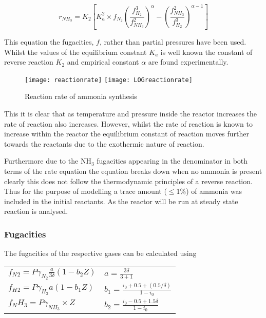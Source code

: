 {\begin{equation} r_{NH_3} = K_2 \left [ K_a^2 \times f_{N_2}
\left ( \frac{f_{H_2}^3}{f_{NH_3}^2} \right ) ^\alpha - \left ( \frac{f_{NH_3}^2}{f_{H_2}^3} \right ) ^{\alpha - 1}
\right ]
\end{equation}

This equation the fugacities, $f$, rather than partial pressures have been used. Whilst the values of the equilibrium constant $K_a$ is well known the constant of reverse reaction $K_2$ and empirical constant $\alpha$ are found experimentally.

{\begin{figure}[h]
		\centering
		\caption{Reaction rate of ammonia synthesis}
		{\centering
			
			\texttt{[image: reactionrate]}
			\texttt{[image: LOGreactionrate]}	
		}

\end{figure}}


This it is clear that as temperature and pressure inside the reactor increases the rate of reaction also increases. However, whilst the rate of reaction is known to increase within the reactor the equilibrium constant of reaction moves further towards the reactants due to the exothermic nature of reaction. 

Furthermore due to the NH$_3$ fugacities appearing in the denominator in both terms of the rate equation the equation breaks down when no ammonia is present clearly this does not follow the thermodynamic principles of a reverse reaction. Thus for the purpose of modelling a trace amount ($\leq$1\%) of ammonia was included in the initial reactants. As the reactor will be run at steady state reaction is analysed. 

\subsubsection{Fugacities}
The fugacities of the respective gases can be calculated using


\begin{table} [!htbp]
	\begin{center}
\begin{tabular}{ p{5cm}p{3cm} }
$f_N{_2}= P\gamma_{N_2}\frac{a}{3\delta}(1-b_2Z)$& $a= \frac{3\delta}{3+ 1}$\\
$f_H{_2}=P\gamma_{H_2}a(1-b_1Z) $&$ b_1 = \frac{i_0 +0.5 + (0.5/\delta)}{1-i_0}$\\
$f_NH{_3}=P\gamma_{NH_3}\times Z $&$ b_2 = \frac{i_0 - 0.5 +1.5\delta}{1-i_0}$ \\
\end{tabular}
\end{center}
\end{table}

}
